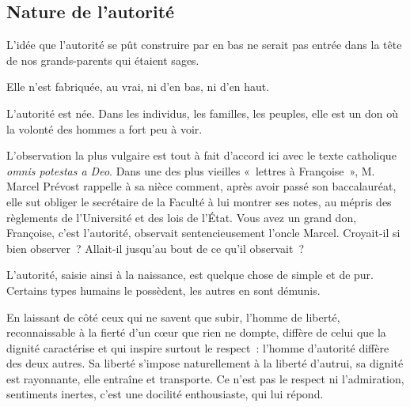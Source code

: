 \documentclass[french,twoside]{book} %
\newcommand{\astermono}{\medskip\centerline{\color{rubric}\large\selectfont{\syms ✻}}\medskip\par}%
\begin{document}
\subsection[Nature de l’autorité]{Nature de l’autorité}
\noindent L’idée que l’autorité se pût construire par en bas ne serait pas entrée dans la tête de nos grands-parents qui étaient sages.\par
Elle n’est fabriquée, au vrai, ni d’en bas, ni d’en haut.\par
L’autorité est née. Dans les individus, les familles, les peuples, elle est un don où la volonté des hommes a fort peu à voir.\par
L’observation la plus vulgaire est tout à fait d’accord ici avec le texte catholique \emph{omnis potestas a Deo}. Dans une des plus vieilles « lettres à Françoise », M. Marcel Prévost rappelle à sa nièce comment, après avoir passé son baccalauréat, elle sut obliger le secrétaire de la Faculté à lui montrer ses notes, au mépris des règlements de l’Université et des lois de l’État. Vous avez un grand don, Françoise, c’est l’autorité, observait sentencieusement l’oncle Marcel. Croyait-il si bien observer ? Allait-il jusqu’au bout de ce qu’il observait ?\par
L’autorité, saisie ainsi à la naissance, est quelque chose de simple et de pur. Certains types humains le possèdent, les autres en sont démunis.\par
En laissant de côté ceux qui ne savent que subir, l’homme de liberté, reconnaissable à la fierté d’un cœur que rien ne dompte, diffère de celui que la dignité caractérise et qui inspire surtout le respect : l’homme d’autorité diffère des deux autres. Sa liberté s’impose naturellement à la liberté d’autrui, sa dignité est rayonnante, elle entraîne et transporte. Ce n’est pas le respect ni l’admiration, sentiments inertes, c’est une docilité enthousiaste, qui lui répond.\par

\astermono
\end{document}
